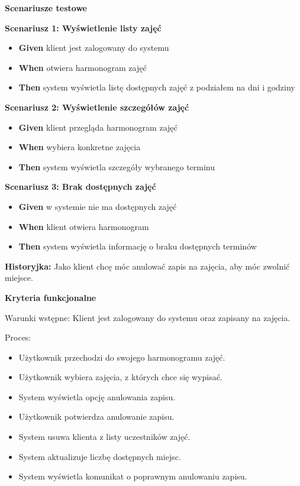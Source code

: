 \documentclass[a4paper,12pt]{article}
\begin{document}
\noindent \textbf{Scenariusze testowe}

\textbf{Scenariusz 1: Wyświetlenie listy zajęć}
\begin{itemize}
    \item \textbf{Given} klient jest zalogowany do systemu
    \item \textbf{When} otwiera harmonogram zajęć
    \item \textbf{Then} system wyświetla listę dostępnych zajęć z podziałem na dni i godziny
\end{itemize}

\textbf{Scenariusz 2: Wyświetlenie szczegółów zajęć}
\begin{itemize}
    \item \textbf{Given} klient przegląda harmonogram zajęć
    \item \textbf{When} wybiera konkretne zajęcia
    \item \textbf{Then} system wyświetla szczegóły wybranego terminu
\end{itemize}

\textbf{Scenariusz 3: Brak dostępnych zajęć}
\begin{itemize}
    \item \textbf{Given} w systemie nie ma dostępnych zajęć
    \item \textbf{When} klient otwiera harmonogram
    \item \textbf{Then} system wyświetla informację o braku dostępnych terminów
\end{itemize}

\vspace{0,5cm}

\noindent \textbf{Historyjka:} Jako klient chcę móc anulować zapis na zajęcia, aby móc zwolnić miejsce.

\vspace{0,2cm}

\noindent \textbf{Kryteria funkcjonalne}

\vspace{0,2cm}

\noindent Warunki wstępne: Klient jest zalogowany do systemu oraz zapisany na zajęcia.

\vspace{0,2cm}

\noindent Proces:

\begin{itemize}
    \item Użytkownik przechodzi do swojego harmonogramu zajęć.
    \item Użytkownik wybiera zajęcia, z których chce się wypisać.
    \item System wyświetla opcję anulowania zapisu.
    \item Użytkownik potwierdza anulowanie zapisu.
    \item System usuwa klienta z listy uczestników zajęć.
    \item System aktualizuje liczbę dostępnych miejsc.
    \item System wyświetla komunikat o poprawnym anulowaniu zapisu.
\end{itemize}
\end{document}
